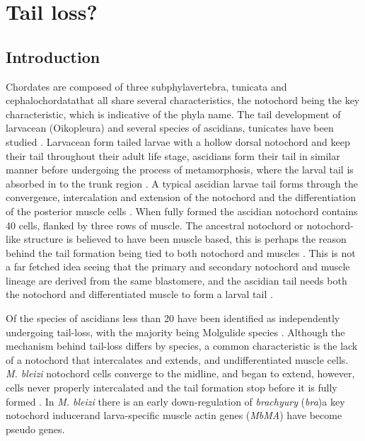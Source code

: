 \chapter{Tail loss?}

\section{Introduction}


Chordates are composed of three subphyla\textemdash vertebra, tunicata and cephalochordata\textemdash that all share several characteristics, the notochord being the key characteristic, which is indicative of the phyla name. The tail development of larvacean (Oikopleura) and several species of ascidians, tunicates have been studied \cite{jeffery_factors_1992,nakatani_mutations_1999,kugler_evolutionary_2011}. Larvacean form tailed larvae with a hollow dorsal notochord and keep their tail throughout their adult life stage, ascidians form their tail in similar manner before undergoing the process of metamorphosis, where the larval tail is absorbed in to the trunk region \cite{paris_history_2008}. A typical ascidian larvae tail forms through the convergence, intercalation and extension of the notochord and the differentiation of the posterior muscle cells \cite{swalla_mechanisms_1993}. When fully formed the ascidian notochord contains 40 cells, flanked by three rows of muscle. The ancestral notochord or notochord-like structure is believed to have been muscle based, this is perhaps the reason behind the tail formation being tied to both notochord and muscles \cite{lauri_development_2014}. This is not a far fetched idea seeing that the primary and secondary notochord and muscle lineage are derived from the same blastomere, and the ascidian tail needs both the notochord and differentiated muscle to form a larval tail \cite{nishida_cell_1987,di_gregorio_tail_2002}.

Of the  species of ascidians less than 20 have been identified as independently undergoing tail-loss, with the majority being Molgulide species \cite{berrill_studies_1931,huber_evolution_2000}. Although the mechanism behind tail-loss differs by species, a common characteristic is the lack of a notochord that intercalates and extends, and undifferentiated muscle cells\cite{swalla_mechanisms_1993}. \textit{M. bleizi} notochord cells converge to the midline, and began to extend, however, cells never properly intercalated and the tail formation stop before it is fully formed \cite{jeffery_evolution_1999}. In \textit{M. bleizi} there is an early down-regulation of \textit{brachyury} (\textit{bra})\textemdash a key notochord inducer\textemdash and larva-specific muscle actin genes (\textit{MbMA}) have become pseudo genes.   


